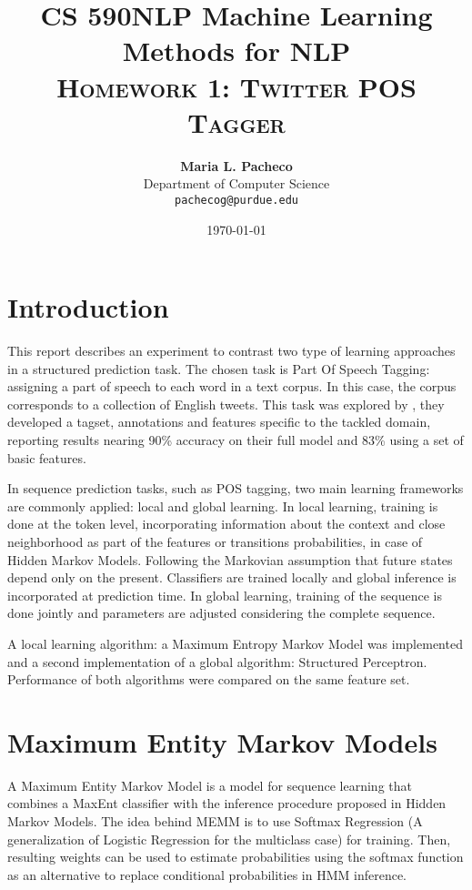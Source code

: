 \documentclass[11pt]{article}
\title{
\textbf{CS 590NLP Machine Learning Methods for NLP} \\ \textsc{Homework 1: Twitter POS Tagger} \\
\normalsize\vspace{0.1in}
}
\author{
	\textbf{Maria L. Pacheco} \\
	Department of Computer Science\\
	\texttt{pachecog@purdue.edu}
}
\date{\today}
\begin{document}
\maketitle

\section{Introduction}

This report describes an experiment to contrast two type of learning approaches in a structured prediction task. The chosen task is Part Of Speech Tagging: assigning a part of speech to each word in a text corpus.  In this case, the corpus corresponds to a collection of English tweets. This task was explored by \cite{Gimpel:2011:PTT:2002736.2002747}, they developed a tagset, annotations and features specific to the tackled domain, reporting results nearing 90\% accuracy on their full model and 83\% using a set of basic features.

In sequence prediction tasks, such as POS tagging, two main learning frameworks are commonly applied: local and global learning. In local learning, training is done at the token level, incorporating information about the context and close neighborhood as part of the features or transitions probabilities, in case of Hidden Markov Models. Following the Markovian assumption that future states depend only on the present. Classifiers are trained locally and global inference is incorporated at prediction time. In global learning, training of the sequence is done jointly and parameters are adjusted considering the complete sequence. 

A local learning algorithm: a Maximum Entropy Markov Model was implemented and a second implementation of a global algorithm: Structured Perceptron. Performance of both algorithms were compared on the same feature set.

\section{Maximum Entity Markov Models}

A Maximum Entity Markov Model \cite{McCallum:2000:MEM:645529.658277} is a model for sequence learning that combines a MaxEnt classifier with the inference procedure proposed in Hidden Markov Models. The idea behind MEMM is to use Softmax Regression (A generalization of Logistic Regression for the multiclass case) for training. Then, resulting weights can be used to estimate probabilities using the softmax function as an alternative to replace conditional probabilities in HMM inference. 
\end{document}
